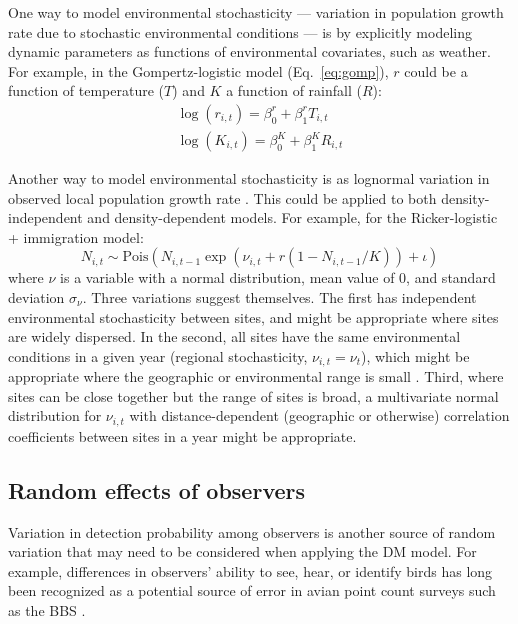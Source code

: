 \documentclass[12pt]{article}
\begin{document}
One way to model environmental stochasticity --- variation in population growth
rate due to stochastic environmental conditions --- is by explicitly
modeling dynamic parameters as functions of environmental covariates, such
as weather.  For example, in the Gompertz-logistic model (Eq.~\ref{eq:gomp}), $r$ could be a 
function of temperature ($T$) and $K$ a function of rainfall ($R$):
\begin{gather}
\log(r_{i,t}) = \beta^{r}_{0} + \beta^{r}_{1}T_{i,t} \nonumber \\
\log(K_{i,t}) = \beta^{K}_{0} + \beta^{K}_{1}R_{i,t}  
\label{eq:weather}
\end{gather}

Another way to model environmental stochasticity is as lognormal variation in observed local population 
growth rate \citep{bjornstad:2001,bonsall_hastings:2004}.  This could be applied to both density-independent and density-dependent models.
For example, for the Ricker-logistic + immigration model:
\begin{equation}
N_{i,t} \sim
\mathrm{Pois}(N_{i,t-1}\exp(\nu_{i,t} + r(1-N_{i,t-1}/K)) + \iota)
\label{eq:nuRand}
\end{equation}
where $\nu$ is a variable with a normal distribution, mean value of 0, and standard deviation $\sigma_\nu$.  
Three variations suggest themselves.  The first has independent environmental stochasticity 
between sites, and might be appropriate where sites are widely dispersed.  In the second, 
all sites have the same environmental conditions in a given year (regional stochasticity, $\nu_{i,t} = \nu_{t}$),
which might be appropriate where the geographic or environmental range is small \citep{hanski:1998}.  
Third, where sites can be close together but the range of sites is broad, a multivariate normal distribution 
for $\nu_{i,t}$ with distance-dependent (geographic or otherwise) correlation coefficients
between sites in a year might be appropriate.

\subsection{Random effects of observers}

Variation in detection probability among observers is another
source of random variation that may need to be considered when applying
the DM model. For example, differences in observers' ability to see,
hear, or identify birds has long been recognized as a potential source of error
in avian point count surveys such as the BBS 
\citep{robbins_etal:1986,sauer_etal:1994auk,campbell_francis:2011}.%
\end{document}
